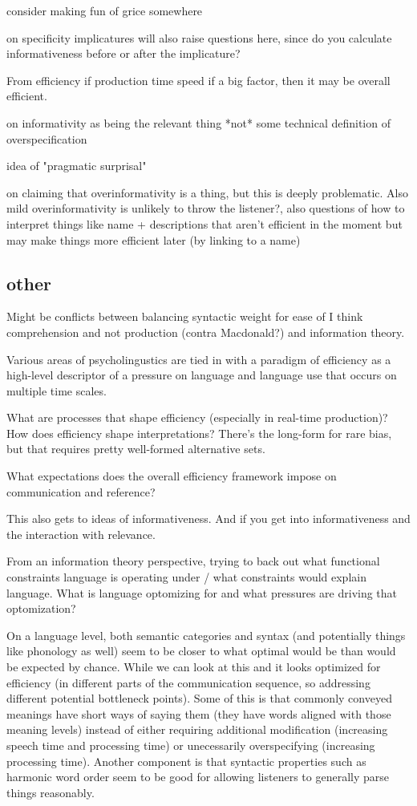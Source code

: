\documentclass[]{article}
\begin{document}
consider making fun of grice somewhere

\cite{bergen} on specificity implicatures will also raise questions here, since do you calculate informativeness before or after the implicature? 


From efficiency if production time speed if a big factor, then it may be overall efficient. 

\cite{degen20200406} on informativity as being the relevant thing *not* some technical definition of overspecification 

idea of "pragmatic surprisal" 

\cite{heller2012} on claiming that overinformativity is a thing, but this is deeply problematic. Also mild overinformativity is unlikely to throw the listener?, also questions of how to interpret things like name + descriptions that aren't efficient in the moment but may make things more efficient later (by linking to a name) 

\subsection{other}

Might be conflicts between balancing syntactic weight for ease of I think comprehension and not production (contra Macdonald?) and information theory. 

Various areas of psycholingustics are tied in with a paradigm of efficiency as a high-level descriptor of a pressure on language and language use that occurs on multiple time scales.


What are processes that shape efficiency (especially in real-time production)? How does efficiency shape interpretations? There's the long-form for rare bias, but that requires pretty well-formed alternative sets. 

What expectations does the overall efficiency framework impose on communication and reference? 

This also gets to ideas of informativeness. And if you get into informativeness and the interaction with relevance. 

\cite{futrell2022} From an information theory perspective, trying to back out what functional constraints language is operating under / what constraints would explain language. What is language optomizing for and what pressures are driving that optomization? 


On a language level, both semantic categories and syntax (and potentially things like phonology as well) seem to be closer to what optimal would be than would be expected by chance. While we can look at this and it looks optimized for efficiency (in different parts of the communication sequence, so addressing different potential bottleneck points). Some of this is that commonly conveyed meanings have short ways of saying them (they have words aligned with those meaning levels) instead of either requiring additional modification (increasing speech time and processing time) or unecessarily overspecifying (increasing processing time). Another component is that syntactic properties such as harmonic word order seem to be good for allowing listeners to generally parse things reasonably. 
\end{document}
